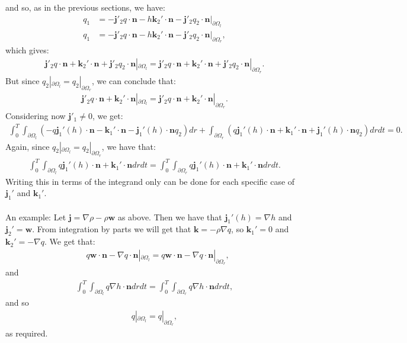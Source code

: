 \documentclass[11pt, a4paper]{article}
\theoremstyle{definition}
\newcommand{\w}{\mathbf{w}}
\newcommand{\n}{\mathbf{n}}
\newcommand{\jf}{\mathbf j}
\begin{document}
and so, as in the previous sections, we have:
\begin{align*}
	q_1 &= -  \jf'_2 q \cdot \n - h\mathbf{k}_2' \cdot \n - \jf'_2 q_2 \cdot \n |_{\partial \Omega_l} \\
	q_1 &= -  \jf'_2 q \cdot \n -  h\mathbf{k}_2' \cdot \n -\jf'_2 q_2 \cdot \n |_{\partial \Omega_r}, 
\end{align*}
which gives:
\begin{align*}
	\jf'_2 q \cdot \n +  \mathbf{k}_2' \cdot \n + \jf'_2 q_2 \cdot \n |_{\partial \Omega_l} =  \jf'_2 q \cdot \n + \mathbf{k}_2' \cdot \n +  \jf'_2 q_2 \cdot \n |_{\partial \Omega_r}.
\end{align*}
But since $q_2|_{\partial \Omega_l} = q_2|_{\partial \Omega_r}$, we can conclude that:
\begin{align*}
	\jf'_2 q \cdot \n + \mathbf{k}_2' \cdot \n  |_{\partial \Omega_l} =  \jf'_2 q \cdot \n + \mathbf{k}_2' \cdot \n  |_{\partial \Omega_r}.
\end{align*}
Considering now $\jf'_1 \neq 0$, we get:
\begin{align*}
	\int_0^T \int_{\partial \Omega_l} \left(- q \jf_1'(h)   \cdot \n  - \mathbf{k}_1' \cdot \n - \jf_1'(h)  \cdot \n q_2  \right)   dr  + \int_{\partial \Omega_r} \left(q \jf_1'(h)   \cdot \n + \mathbf{k}_1' \cdot \n + \jf_1'(h)  \cdot \n q_2  \right)   dr dt = 0 .
\end{align*}
Again, since $q_2|_{\partial \Omega_l} = q_2|_{\partial \Omega_r}$, we have that:
\begin{align*}
	\int_0^T \int_{\partial \Omega_l}  q \jf_1'(h)   \cdot \n  +\mathbf{k}_1' \cdot \n   dr dt = \int_0^T \int_{\partial \Omega_r} q \jf_1'(h)   \cdot \n  +  \mathbf{k}_1' \cdot \n  dr dt .
\end{align*}
Writing this in terms of the integrand only can be done for each specific case of $\jf_1'$ and $\mathbf{k}_1'$. 
\\
\\
An example: Let $\jf = \nabla \rho - \rho \w$ as above. Then we have that $\jf_1'(h) = \nabla h$ and $\jf_2' = \w $. From integration by parts we will get that $\mathbf k = - \rho \nabla q$, so $\mathbf k_1' = 0$ and $\mathbf k_2' = -  \nabla q$.
We get that:
\begin{align*}
	&q\w  \cdot \n  - \nabla q \cdot \n |_{\partial \Omega_l} = q\w  \cdot \n  - \nabla q \cdot \n |_{\partial \Omega_r},
\end{align*}
and
\begin{align*}
	\int_0^T \int_{\partial \Omega_l}  q \nabla h   \cdot \n    dr dt = \int_0^T \int_{\partial \Omega_r} q \nabla h  \cdot \n    dr dt,
\end{align*}
and so 
\begin{align*}
	q |_{\partial \Omega_l} = q|_{\partial \Omega_r},
\end{align*}
as required.	
	
	
	
	
	
	
	
	
\end{document}
